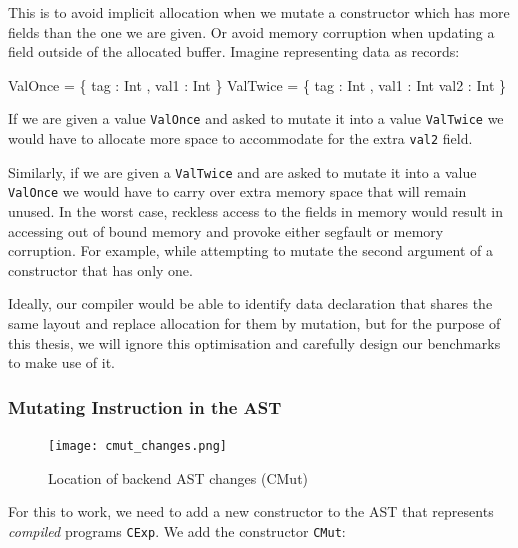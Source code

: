 \documentclass[
]{article}
\newenvironment{Shaded}{}{}
\newcommand{\DataTypeTok}[1]{\textcolor[rgb]{0.56,0.13,0.00}{#1}}
\newcommand{\NormalTok}[1]{#1}
\newcommand{\OperatorTok}[1]{\textcolor[rgb]{0.40,0.40,0.40}{#1}}
\newcommand{\OtherTok}[1]{\textcolor[rgb]{0.00,0.44,0.13}{#1}}
\begin{document}
This is to avoid implicit allocation when we mutate a constructor which
has more fields than the one we are given. Or avoid memory corruption
when updating a field outside of the allocated buffer. Imagine
representing data as records:

\begin{Shaded}
\begin{Highlighting}[]
\DataTypeTok{ValOnce} \OtherTok{=}\NormalTok{ \{ tag }\OperatorTok{:} \DataTypeTok{Int}\NormalTok{ , val1 }\OperatorTok{:} \DataTypeTok{Int}\NormalTok{ \}}
\DataTypeTok{ValTwice} \OtherTok{=}\NormalTok{ \{ tag }\OperatorTok{:} \DataTypeTok{Int}\NormalTok{ , val1 }\OperatorTok{:} \DataTypeTok{Int}\NormalTok{ val2 }\OperatorTok{:} \DataTypeTok{Int}\NormalTok{ \}}
\end{Highlighting}
\end{Shaded}

If we are given a value \texttt{ValOnce} and asked to mutate it into a
value \texttt{ValTwice} we would have to allocate more space to
accommodate for the extra \texttt{val2} field.

Similarly, if we are given a \texttt{ValTwice} and are asked to mutate
it into a value \texttt{ValOnce} we would have to carry over extra
memory space that will remain unused. In the worst case, reckless access
to the fields in memory would result in accessing out of bound memory
and provoke either segfault or memory corruption. For example, while
attempting to mutate the second argument of a constructor that has only
one.

Ideally, our compiler would be able to identify data declaration that
shares the same layout and replace allocation for them by mutation, but
for the purpose of this thesis, we will ignore this optimisation and
carefully design our benchmarks to make use of it.

\hypertarget{mutating-instruction-in-the-ast}{%
\subsubsection{Mutating Instruction in the
AST}\label{mutating-instruction-in-the-ast}}

\begin{figure}
\centering
\texttt{[image: cmut\_changes.png]}
\caption{Location of backend AST changes (CMut)}
\end{figure}

For this to work, we need to add a new constructor to the AST that
represents \emph{compiled} programs \texttt{CExp}. We add the
constructor \texttt{CMut}:
\end{document}

